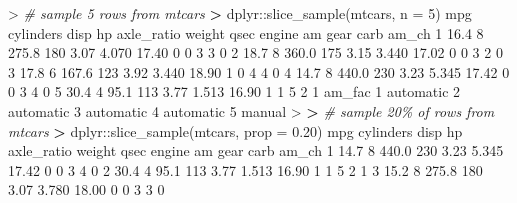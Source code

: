 \documentclass[
]{book}
\newenvironment{Shaded}{\begin{snugshade}}{\end{snugshade}}
\newcommand{\AttributeTok}[1]{\textcolor[rgb]{0.77,0.63,0.00}{#1}}
\newcommand{\CommentTok}[1]{\textcolor[rgb]{0.56,0.35,0.01}{\textit{#1}}}
\newcommand{\DecValTok}[1]{\textcolor[rgb]{0.00,0.00,0.81}{#1}}
\newcommand{\ErrorTok}[1]{\textcolor[rgb]{0.64,0.00,0.00}{\textbf{#1}}}
\newcommand{\FloatTok}[1]{\textcolor[rgb]{0.00,0.00,0.81}{#1}}
\newcommand{\FunctionTok}[1]{\textcolor[rgb]{0.00,0.00,0.00}{#1}}
\newcommand{\NormalTok}[1]{#1}
\newcommand{\SpecialCharTok}[1]{\textcolor[rgb]{0.00,0.00,0.00}{#1}}
\begin{document}
\begin{Shaded}
\begin{Highlighting}[]
\SpecialCharTok{\textgreater{}} \CommentTok{\# sample 5 rows from mtcars}
\ErrorTok{\textgreater{}}\NormalTok{ dplyr}\SpecialCharTok{::}\FunctionTok{slice\_sample}\NormalTok{(mtcars, }\AttributeTok{n =} \DecValTok{5}\NormalTok{)}
\NormalTok{   mpg cylinders  disp  hp axle\_ratio weight  qsec engine am gear carb am\_ch}
\DecValTok{1} \FloatTok{16.4}         \DecValTok{8} \FloatTok{275.8} \DecValTok{180}       \FloatTok{3.07}  \FloatTok{4.070} \FloatTok{17.40}      \DecValTok{0}  \DecValTok{0}    \DecValTok{3}    \DecValTok{3}     \DecValTok{0}
\DecValTok{2} \FloatTok{18.7}         \DecValTok{8} \FloatTok{360.0} \DecValTok{175}       \FloatTok{3.15}  \FloatTok{3.440} \FloatTok{17.02}      \DecValTok{0}  \DecValTok{0}    \DecValTok{3}    \DecValTok{2}     \DecValTok{0}
\DecValTok{3} \FloatTok{17.8}         \DecValTok{6} \FloatTok{167.6} \DecValTok{123}       \FloatTok{3.92}  \FloatTok{3.440} \FloatTok{18.90}      \DecValTok{1}  \DecValTok{0}    \DecValTok{4}    \DecValTok{4}     \DecValTok{0}
\DecValTok{4} \FloatTok{14.7}         \DecValTok{8} \FloatTok{440.0} \DecValTok{230}       \FloatTok{3.23}  \FloatTok{5.345} \FloatTok{17.42}      \DecValTok{0}  \DecValTok{0}    \DecValTok{3}    \DecValTok{4}     \DecValTok{0}
\DecValTok{5} \FloatTok{30.4}         \DecValTok{4}  \FloatTok{95.1} \DecValTok{113}       \FloatTok{3.77}  \FloatTok{1.513} \FloatTok{16.90}      \DecValTok{1}  \DecValTok{1}    \DecValTok{5}    \DecValTok{2}     \DecValTok{1}
\NormalTok{     am\_fac}
\DecValTok{1}\NormalTok{ automatic}
\DecValTok{2}\NormalTok{ automatic}
\DecValTok{3}\NormalTok{ automatic}
\DecValTok{4}\NormalTok{ automatic}
\DecValTok{5}\NormalTok{    manual}
\SpecialCharTok{\textgreater{}} 
\ErrorTok{\textgreater{}} \CommentTok{\# sample 20\% of rows from mtcars}
\ErrorTok{\textgreater{}}\NormalTok{ dplyr}\SpecialCharTok{::}\FunctionTok{slice\_sample}\NormalTok{(mtcars, }\AttributeTok{prop =} \FloatTok{0.20}\NormalTok{)}
\NormalTok{   mpg cylinders  disp  hp axle\_ratio weight  qsec engine am gear carb am\_ch}
\DecValTok{1} \FloatTok{14.7}         \DecValTok{8} \FloatTok{440.0} \DecValTok{230}       \FloatTok{3.23}  \FloatTok{5.345} \FloatTok{17.42}      \DecValTok{0}  \DecValTok{0}    \DecValTok{3}    \DecValTok{4}     \DecValTok{0}
\DecValTok{2} \FloatTok{30.4}         \DecValTok{4}  \FloatTok{95.1} \DecValTok{113}       \FloatTok{3.77}  \FloatTok{1.513} \FloatTok{16.90}      \DecValTok{1}  \DecValTok{1}    \DecValTok{5}    \DecValTok{2}     \DecValTok{1}
\DecValTok{3} \FloatTok{15.2}         \DecValTok{8} \FloatTok{275.8} \DecValTok{180}       \FloatTok{3.07}  \FloatTok{3.780} \FloatTok{18.00}      \DecValTok{0}  \DecValTok{0}    \DecValTok{3}    \DecValTok{3}     \DecValTok{0}

\end{Highlighting}
\end{Shaded}
\end{document}
